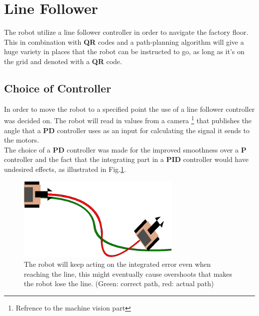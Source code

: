 \section{Line Follower}
The robot utilize a line follower controller in order to navigate the factory floor. This in combination with \textbf{QR} codes and a path-planning algorithm will give a huge variety in places that the robot can be instructed to go, as long as it's on the grid and denoted with a \textbf{QR} code.

\subsection{Choice of Controller} \label{sec:choice_of_cont}

In order to move the robot to a specified point the use of a line follower controller was decided on. The robot will read in values from a camera \footnote{Refrence to the machine vision part} that publishes the angle that a \textbf{PD} controller uses as an input for calculating the signal it sends to the motors.\\
\indent The choice of a \textbf{PD} controller was made for the improved smoothness over a \textbf{P} controller and the fact that the integrating part in a \textbf{PID} controller would have undesired effects, as illustrated in Fig.\ref{fig:PID_bad}. 

\begin{figure}[H]
    \centering
    \includegraphics[width=0.7\textwidth]{img/Pid_bad.eps}
    \caption{The robot will keep acting on the integrated error even when reaching the line, this might eventually cause overshoots that makes the robot lose the line. (Green: correct path, red: actual path)  }
    \label{fig:PID_bad}
\end{figure}
